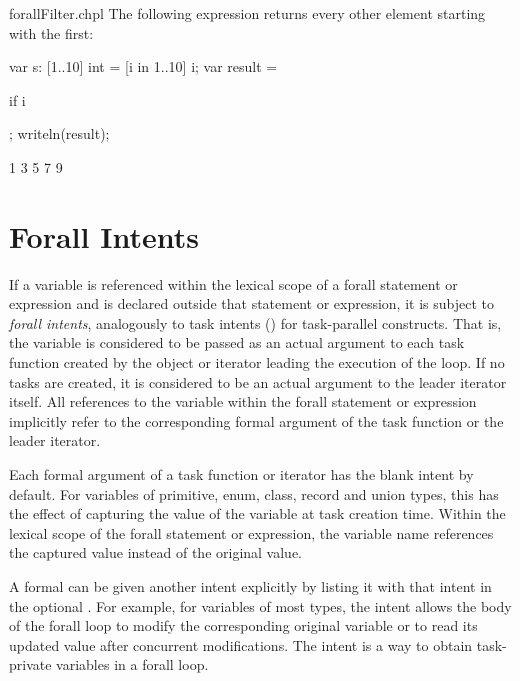 \begin{chapelexample}{forallFilter.chpl}
The following expression returns every other element starting with the
first:
\begin{chapelpre}
var s: [1..10] int = [i in 1..10] i;
var result =
\end{chapelpre}
\begin{chapel}
[i in 1..s.numElements] if i %
\end{chapel}
\begin{chapelpost}
;
writeln(result);
\end{chapelpost}
\begin{chapeloutput}
1 3 5 7 9
\end{chapeloutput}
\end{chapelexample}


\section{Forall Intents}
\label{Forall_Intents}

If a variable is referenced within the lexical scope of a
forall statement or expression and is declared outside
that statement or expression, it is subject to \emph{forall intents},
analogously to task intents ()
for task-parallel constructs. That is, the variable is considered
to be passed as an actual argument to
each task function created by the object or iterator leading
the execution of the loop. If no tasks are created,
it is considered to be an actual argument to the leader
iterator itself. All references to the variable
within the forall statement or expression implicitly refer
to the corresponding formal argument of the task function
or the leader iterator.

Each formal argument of a task function or iterator has the blank
intent by default.  For variables of primitive, enum, class, record
and union types, this has the effect of capturing the value of the
variable at task creation time.  Within the lexical scope of the
forall statement or expression, the variable name references the
captured value instead of the original value.

A formal can be given another intent explicitly by listing it
with that intent in the optional .
For example, for variables of most types, the  intent allows
the body of the forall loop to modify the corresponding original
variable or to read its updated value after concurrent modifications.
The  intent is a way to obtain task-private variables
in a forall loop.

